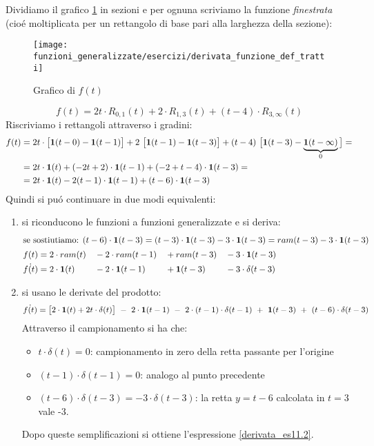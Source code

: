 \documentclass[../main.tex]{subfiles}
\begin{document}
		\begin{mdframed}[style=Exercise]
			\begin{Exercise}[title={Derivata di una funzione definita a tratti}, difficulty=3]
				Dividiamo il grafico \ref{fig:grafico_f} in sezioni e per ognuna scriviamo la funzione \textit{finestrata} (cio\'e moltiplicata per un rettangolo di base pari alla larghezza della sezione):
				\begin{figure}[H]
					\centering\texttt{[image: funzioni\_generalizzate/esercizi/derivata\_funzione\_def\_tratti]}
					\caption{Grafico di $ f(t) $}
					\label{fig:grafico_f}
				\end{figure}
				\[
					f(t) = 2t \cdot R_{0,1}(t) + 2 \cdot R_{1,3}(t) + (t-4) \cdot R_{3,\infty}(t)
				\]
				Riscriviamo i rettangoli attraverso i gradini:
				\[
					\begin{aligned}
						f(t) &= 2t \cdot \big[ \gr[t-0] - \gr[t-1] \big] + 2\ \big[\gr[t-1] - \gr[t-3]\big] + (t-4)\ \big[\gr[t-3] - \underbrace{\gr[t - \infty]}_{0} \big] =
						\\
						&= 2t \cdot \gr[t] + (-2t+2) \cdot \gr[t-1] + (-2+t-4) \cdot \gr[t-3] =
						\\
						&= 2t \cdot \gr[t] - 2(t-1) \cdot \gr[t-1] + (t-6) \cdot \gr[t-3]
					\end{aligned}
				\]
				Quindi si pu\'o continuare in due modi equivalenti:
				\begin{enumerate}
					\item 
						si riconducono le funzioni a funzioni generalizzate e si deriva:
						\begin{align}
							\intertext{se sostiutiamo: $ (t-6) \cdot \gr[t-3] = (t-3) \cdot \gr[t-3] - 3 \cdot \gr[t-3] = ram(t-3) - 3 \cdot \gr[t-3] $}
							f(t) &= 2 \cdot ram(t) &&- 2 \cdot ram(t-1) &&+ram(t-3) &&- 3 \cdot \gr[t-3] \nonumber\\
							\dot{f(t)} &= 2 \cdot \textbf{1}(t) &&- 2 \cdot \gr[t-1] &&+ \gr[t-3] && - 3 \cdot \delta(t-3)
							\label{derivata_es11.2}
						\end{align}
					\item 
						si usano le derivate del prodotto:
						\[
							\dot{f(t)} = \big[ 2 \cdot \gr[t] + 2t \cdot \delta(t) \big]\ -\ 2 \cdot \gr[t-1]\ -\ 2 \cdot (t-1) \cdot \delta(t-1)\ +\ \gr[t-3]\ +\ (t-6) \cdot \delta(t-3)
						\]
						Attraverso il campionamento si ha che:
						\begin{itemize}
							\item 
								$ t \cdot \delta(t) = 0 $: campionamento in zero della retta passante per l'origine
							\item
								$ (t-1) \cdot \delta(t-1) = 0$: analogo al punto precedente
							\item
								$ (t-6) \cdot \delta(t-3) = - 3 \cdot \delta(t-3) $: la retta $ y=t-6 $ calcolata in $ t=3 $ vale -3. 
						\end{itemize}
						Dopo queste semplificazioni si ottiene l'espressione \ref{derivata_es11.2}.
				\end{enumerate}
			\end{Exercise}
		\end{mdframed}
\end{document}
